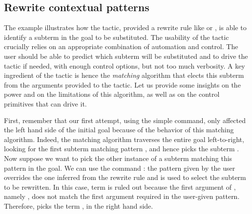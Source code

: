 %
%



\subsection{Rewrite contextual patterns}\label{sec:rewrite2}


The example  illustrates how the  tactic, provided a
rewrite rule like  or , is able
to identify a
subterm in the goal to be substituted. The usability of the
tactic crucially relies on an appropriate combination of automation
and control. The user should be able to predict which subterm will be
substituted and to drive the tactic if needed, with enough control
options, but not too much verbosity. A key ingredient of the
 tactic is hence the \emph{matching} algorithm that
elects this subterm from the arguments provided to the tactic. Let us
provide some insights on the power and on the limitations of this
algorithm, as well as on the control primitives that can drive it.

First, remember that our first attempt, using the simple
 command, only
affected the left hand side of the initial goal because of the
behavior of this matching algorithm.
Indeed, the matching algorithm traverses the entire goal
left-to-right, looking for the first subterm matching pattern
\C{(_ <= _)},  and hence picks the subterm .
Now suppose we want to pick
the other instance of a subterm matching this pattern in the goal. We
can use the command : the
pattern given by the user overrides the one inferred from the rewrite
rule and is used to select the subterm to be rewritten. In this case,
term  is ruled out because the first argument of
\C{<=}, namely , does not match the first argument 
required in the user-given pattern. Therefore,  picks the term
, in the right hand side.

